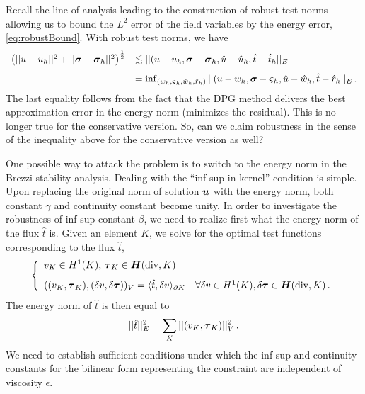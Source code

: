 \documentclass[Proposal.tex]{subfiles}
\begin{document}
Recall the line of analysis leading to the construction of robust
test norms allowing us to bound the $L^2$ error of the field variables by the
energy error, \eqref{eq:robustBound}. With robust test norms, we have
\begin{equation}
\begin{array}{ll}
   \left( || u - u_h ||^2+ || \boldsymbol\sigma - \boldsymbol\sigma_h ||^2 \right)^{\frac{1}{2}}
& \lesssim || (u - u_h, \boldsymbol\sigma - \boldsymbol\sigma_h, \hat{u} - \hat{u}_h, \hat{t} - \hat{t}_h ||_E \\[8pt]
&= \inf_{(w_h,\boldsymbol\varsigma_h,\hat{w}_h,\hat{r}_h)}
|| (u - w_h, \boldsymbol\sigma - \boldsymbol\varsigma_h, \hat{u} - \hat{w}_h, \hat{t} - \hat{r}_h ||_E\,.
\end{array}
\end{equation}
The last equality follows from the fact that the DPG method delivers the best approximation
error in the energy norm (minimizes the residual). This is no longer true for the
conservative version. So, can we claim robustness in the sense of the inequality above
for the conservative version as well?

One possible way to attack the problem is to switch to the energy norm in the Brezzi stability
analysis. Dealing with the ``inf-sup in kernel'' condition is simple. Upon replacing
the original norm of solution $\boldsymbol u$ with the energy norm, both constant $\gamma$ and continuity
constant become unity. In order to investigate the robustness of inf-sup  constant $\beta$,
we need to realize first what the energy norm of the flux $\hat{t}$ is. Given an element $K$,
we solve for the optimal test functions corresponding to the flux $\hat{t}$,
\begin{equation}
\left\{
\begin{array}{ll}
v_K \in H^1(K),\, \boldsymbol\tau_K \in \mbox{\boldmath $H$}(\text{div},K)\\[8pt]
((v_K,\boldsymbol\tau_K), (\delta v,\delta \boldsymbol\tau))_V = \langle \hat{t},\delta v\rangle_{\partial K}
\quad \forall \delta v \in H^1(K), \delta \boldsymbol\tau \in \mbox{\boldmath $H$}(\text{div},K)\,.
\end{array}
\right.
\label{eq:local_problem}
\end{equation}
The energy norm of $\hat{t}$ is then equal to
\begin{equation}
|| \hat{t} ||_E^2 = \sum_K || (v_K,\boldsymbol\tau_K) ||_V^2\,.
\end{equation}
We need to establish sufficient conditions under which the inf-sup and continuity constants for
the bilinear form representing the constraint are independent of viscosity $\epsilon$.
\end{document}

